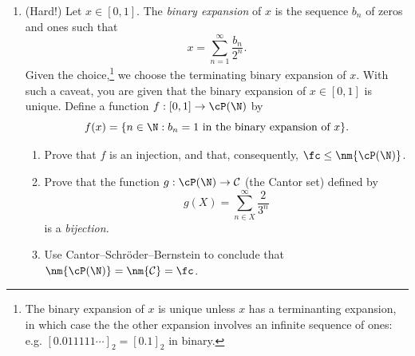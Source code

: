 \begin{enumerate}
  		
	\item (Hard!) Let $x\in[0,1]$. The \emph{binary expansion} of $x$ is the sequence $b_n$ of zeros and ones such that
  \[x=\sum_{n=1}^\infty \frac{b_n}{2^n}.\]
  Given the choice,\footnote{The binary expansion of $x$ is unique unless $x$ has a terminanting expansion, in which case the the other expansion involves an infinite sequence of ones: e.g. $[0.011111\cdots]_2=[0.1]_2$ in binary.} we choose the terminating binary expansion of $x$. With such a caveat, you are given that the binary expansion of $x\in[0,1]$ is unique. Define a function $f:[0,1]\to\cP(\N)$ by
  \[f(x)=\{n\in\N:b_n=1\text{ in the binary expansion of $x$}\}.\]
  \begin{enumerate}
    \item Prove that $f$ is an injection, and that, consequently, $\fc\le\nm{\cP(\N)}$.
		\item Prove that the function $g:\cP(\N)\to\mathcal C$ (the Cantor set) defined by
		\[g(X)=\sum\limits_{n\in X}^\infty\frac{2}{3^n}\]
		is a \emph{bijection.}
		\item Use Cantor--Schr\"oder--Bernstein to conclude that $\nm{\cP(\N)}=\nm{\mathcal C}=\fc$.
	\end{enumerate}
\end{enumerate}

\fi